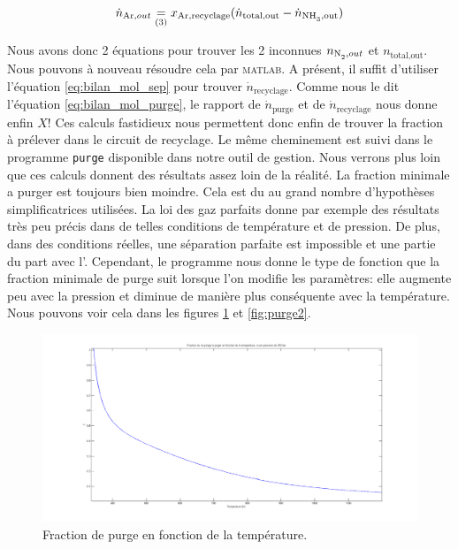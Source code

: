 \[ 
\dot{n}_{\ce{Ar},out}\underset{(3)} = 
x_{\ce{Ar},\text{recyclage}}(\dot{n}_{\text{total,out}}-\dot{n}_{\ce{NH3},\text{out}}) 
\]

Nous avons donc 2 équations pour trouver 
les 2 inconnues $n_{\ce{N2},out}$ et $n_{\text{total,out}}$. 
Nous pouvons à nouveau résoudre cela par \textsc{matlab}. 
A présent, il suffit d'utiliser l'équation \ref{eq:bilan_mol_sep} 
pour trouver $\dot{n}_{\text{recyclage}}$. 
Comme nous le dit l'équation \ref{eq:bilan_mol_purge}, 
le rapport de $\dot{n}_{\text{purge}}$ 
et de $\dot{n}_{\text{recyclage}}$ nous donne enfin $X$! 
Ces calculs fastidieux nous permettent donc enfin de trouver la fraction à prélever 
dans le circuit de recyclage. 
Le même cheminement est suivi dans le programme \texttt{purge} 
disponible dans notre outil de gestion. Nous verrons plus loin que ces calculs donnent
des résultats assez loin de la réalité. La fraction minimale a purger est toujours
bien moindre. Cela est du au grand nombre d'hypothèses simplificatrices utilisées. 
La loi des gaz parfaits donne par exemple des résultats très peu précis 
dans de telles conditions de température et de pression. 
De plus, dans des conditions réelles, une séparation parfaite est impossible 
et une partie du  part avec l'.
Cependant, le programme nous donne le type de fonction que la fraction minimale de purge
suit lorsque l'on modifie les paramètres: elle augmente peu avec la pression et diminue
de manière plus conséquente avec la température. Nous pouvons voir cela dans les figures
\ref{fig:purge1} et \ref{fig:purge2}.

\begin{figure}[h!]
	\begin{center}
		\includegraphics[scale=0.3]{purge1.png}
	\end{center}
	\caption{Fraction de purge en fonction de la température.}
	\label{fig:purge1}
\end{figure}

